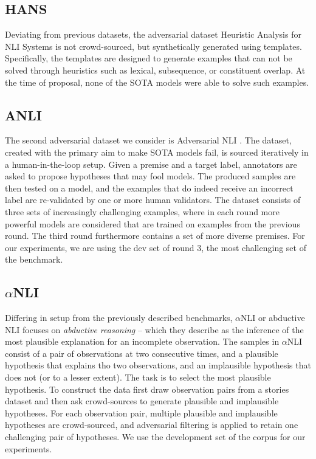 \subsection{HANS}
Deviating from previous datasets, the adversarial dataset Heuristic Analysis for NLI Systems \citep[HANS,][]{mccoy-etal-2019-right} is not crowd-sourced, but synthetically generated using templates.
Specifically, the templates are designed to generate examples that can not be solved through heuristics such as lexical, subsequence, or constituent overlap.
At the time of proposal, none of the SOTA models were able to solve such examples.

\subsection{ANLI}
The second adversarial dataset we consider is Adversarial NLI \citep[or ANLI,][]{nie-etal-2020-adversarial}.
The dataset, created with the primary aim to make SOTA models fail, is sourced iteratively in a human-in-the-loop setup.
Given a premise and a target label, annotators are asked to propose hypotheses that may fool models.
The produced samples are then tested on a model, and the examples that do indeed receive an incorrect label are re-validated by one or more human validators.
The dataset consists of three sets of increasingly challenging examples, where in each round more powerful models are considered that are trained on examples from the previous round.
The third round furthermore contains a set of more diverse premises.
For our experiments, we are using the dev set of round 3, the most challenging set of the benchmark.

\subsection{$\alpha$NLI}
Differing in setup from the previously described benchmarks, $\alpha$NLI or abductive NLI \citep{bhagavatula2020abductive} focuses on \emph{abductive reasoning} -- which they describe as the inference of the most plausible explanation for an incomplete observation.
The samples in $\alpha$NLI consist of a pair of observations at two consecutive times, and a plausible hypothesis that explains tho two observations, and an implausible hypothesis that does not (or to a lesser extent).
The task is to select the most plausible hypothesis.
To construct the data \citet{bhagavatula2020abductive} first draw observation pairs from a stories dataset and then ask crowd-sources to generate plausible and implausible hypotheses. 
For each observation pair, multiple plausible and implausible hypotheses are crowd-sourced, and adversarial filtering is applied to retain one challenging pair of hypotheses.
We use the development set of the corpus for our experiments.

